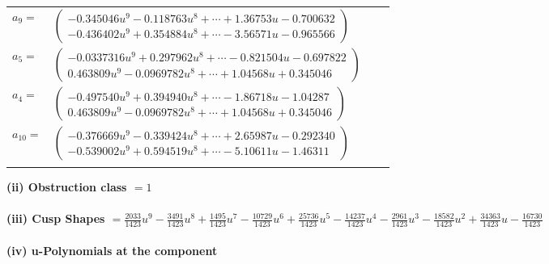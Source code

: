 \documentclass[1p]{elsarticle_modified}
\theoremstyle{definition}
\begin{document}
\begin{tabular}{m{7pt} m{180pt} m{7pt} m{180pt} }
\flushright $a_{9}=$&$\begin{pmatrix}-0.345046 u^{9}-0.118763 u^{8}+\cdots+1.36753 u-0.700632\\-0.436402 u^{9}+0.354884 u^{8}+\cdots-3.56571 u-0.965566\end{pmatrix}$ \\
\flushright $a_{5}=$&$\begin{pmatrix}-0.0337316 u^{9}+0.297962 u^{8}+\cdots-0.821504 u-0.697822\\0.463809 u^{9}-0.0969782 u^{8}+\cdots+1.04568 u+0.345046\end{pmatrix}$ \\
\flushright $a_{4}=$&$\begin{pmatrix}-0.497540 u^{9}+0.394940 u^{8}+\cdots-1.86718 u-1.04287\\0.463809 u^{9}-0.0969782 u^{8}+\cdots+1.04568 u+0.345046\end{pmatrix}$ \\
\flushright $a_{10}=$&$\begin{pmatrix}-0.376669 u^{9}-0.339424 u^{8}+\cdots+2.65987 u-0.292340\\-0.539002 u^{9}+0.594519 u^{8}+\cdots-5.10611 u-1.46311\end{pmatrix}$\\&\end{tabular}
\flushleft \textbf{(ii) Obstruction class $= 1$}\\~\\
\flushleft \textbf{(iii) Cusp Shapes $= \frac{2033}{1423} u^9-\frac{3491}{1423} u^8+\frac{1495}{1423} u^7-\frac{10729}{1423} u^6+\frac{25736}{1423} u^5-\frac{14237}{1423} u^4-\frac{2961}{1423} u^3-\frac{18582}{1423} u^2+\frac{34363}{1423} u-\frac{16730}{1423}$}\\~\\
\newpage\renewcommand{\arraystretch}{1}
\flushleft \textbf{(iv) u-Polynomials at the component}\newline \\
\end{document}

